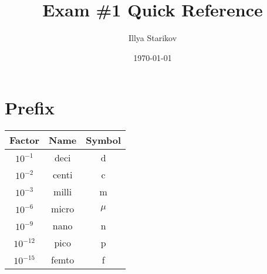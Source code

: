 \documentclass[12pt]{article}
\title{Exam \#1 Quick Reference}
\date{\today}
\author{Illya Starikov}
\begin{document}
\maketitle
\section{Prefix}

\begin{center}
    \begin{tabular}{|c|c|c|}
        \hline
        \textbf{Factor} & \textbf{Name} & \textbf{Symbol} \\ \hline
        $10^{-1}$   &   deci    &   d       \\ \hline
        $10^{-2}$   &   centi   &   c       \\ \hline
        $10^{-3}$   &   milli   &   m       \\ \hline
        $10^{-6}$   &   micro   &   $\mu$  \\ \hline
        $10^{-9}$   &   nano    &   n       \\ \hline
        $10^{-12}$  &   pico    &   p       \\ \hline
        $10^{-15}$  &   femto   &   f       \\ \hline
    \end{tabular}
\end{center}
\end{document}
